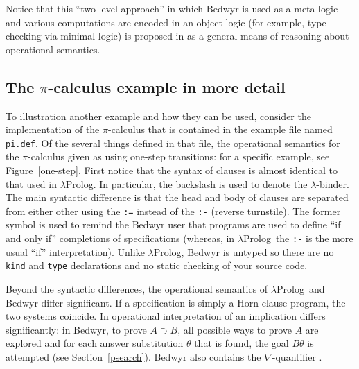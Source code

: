 \documentclass{article}
\newcommand{\lp}{$\lambda$Prolog}
\begin{document}
Notice that this ``two-level approach'' in which Bedwyr is used as a
meta-logic and various computations are encoded in an object-logic
(for example, type checking via minimal logic) is proposed in
\cite{miller06ijcar} as a general means of reasoning about operational
semantics.

\subsection{The $\pi$-calculus example in more detail}

To illustration another example and how they
can be used, consider the implementation of the $\pi$-calculus that is
contained in the example file named \verb+pi.def+.  Of the several
things defined in that file, the operational semantics for the
$\pi$-calculus given as using one-step transitions: for a specific
example, see Figure~\ref{one-step}.  First notice that the syntax of
clauses is almost identical to that used in $\lambda$Prolog.  In
particular, the backslash is used to denote the $\lambda$-binder.  The
main syntactic difference is that the head and body of clauses are
separated from either other using the \verb+:=+ instead of the
\verb+:-+ (reverse turnstile).  The former symbol is used to remind
the Bedwyr user that programs are used to define ``if and only if''
completions of specifications (whereas, in \lp\ the \verb+:-+ is the
more usual ``if'' interpretation).  Unlike \lp, Bedwyr is
untyped so there are no {\tt kind} and {\tt type} declarations and no
static checking of your source code.  

Beyond the syntactic differences, the operational semantics of \lp\
and Bedwyr differ significant.  If a specification is simply a Horn
clause program, the two systems coincide.  In operational
interpretation of an implication differs significantly: in Bedwyr, to
prove $A\supset B$, all possible ways to prove $A$ are explored and
for each answer substitution $\theta$ that is found, the goal
$B\theta$ is attempted (see Section~\ref{psearch}).  Bedwyr also
contains the $\nabla$-quantifier \cite{miller05tocl}. 
\end{document}
